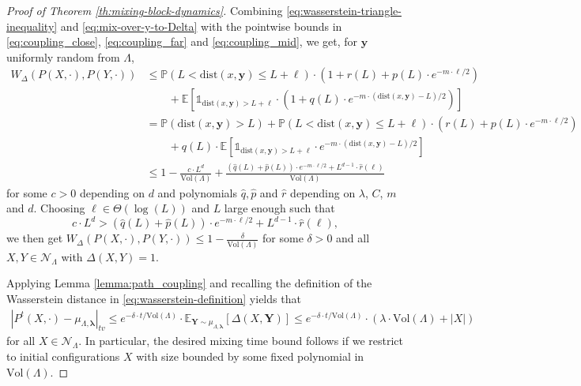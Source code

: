 \documentclass[10pt]{amsart}
\theoremstyle{definition}
\theoremstyle{remark}
\newcommand{\pointsets}{\mathcal{N}}
\newcommand{\ind}[1]{\mathds{1}_{#1}}
\newcommand{\bY}{\mathbf{Y}}
\newcommand{\dist}{\mathrm{dist}}
\renewcommand{\P}{\mathbb{P}}
\newcommand{\E}{\mathbb{E}}
\newcommand{\region}{\Lambda}
\newcommand{\activity}{\lambda}
\newcommand{\activities}{\pmb{\lambda}}
\newcommand{\size}[1]{\left\lvert#1\right\rvert}
\newcommand{\vol}{\mathrm{Vol}}
\newcommand{\randpoint}{\mathbf{y}}
\newcommand{\absolute}[1]{\left\lvert#1\right\rvert}
\begin{document}
\begin{proof}[Proof of Theorem \ref{th:mixing-block-dynamics}]
		Combining \eqref{eq:wasserstein-triangle-inequality} and \eqref{eq:mix-over-y-to-Delta} with the pointwise bounds in  \eqref{eq:coupling_close}, \eqref{eq:coupling_far} and \eqref{eq:coupling_mid}, we get, for $\randpoint$ uniformly random from $\region$,
		\begin{align*}
			W_{\Delta}(P(X, \cdot), P(Y, \cdot)) 
			&\le \P(L < \dist(x, \randpoint) \le L + \ell) \cdot \left(1 + r(L) + p(L) \cdot e^{-m \cdot \ell/2} \right) \\
			&\hspace{2em} + \E\left[\ind{\dist(x, \randpoint) > L + \ell} \cdot \left(1 + q(L) \cdot e^{-m \cdot (\dist(x, \randpoint) - L) / 2}\right)\right] \\
			&= \P(\dist(x, \randpoint) > L) + \P(L < \dist(x, \randpoint) \le L + \ell) \cdot \left(r(L) + p(L) \cdot e^{-m \cdot \ell/2} \right) \\
			&\hspace{2em} + q(L) \cdot \E\left[\ind{\dist(x, \randpoint) > L + \ell} \cdot e^{-m \cdot (\dist(x, \randpoint) - L) / 2} \right] \\
			&\le 1 - \frac{c \cdot L^d}{\vol(\region)} + \frac{(\hat{q}(L) + \hat{p}(L)) \cdot e^{-m\cdot \ell /2} + L^{d-1} \cdot \hat{r}(\ell)}{\vol(\region)} 
		\end{align*}
		for some $c > 0$ depending on $d$ and polynomials $\hat{q}, \hat{p}$ and $\hat{r}$ depending on $\activity$, $C$, $m$ and $d$.
		Choosing $\ell \in \Theta(\log(L))$ and $L$ large enough such that
		\[
		c \cdot L^d > (\hat{q}(L) + \hat{p}(L)) \cdot e^{-m\cdot \ell /2} + L^{d-1} \cdot \hat{r}(\ell),
		\]
		we then get $W_{\Delta}(P(X, \cdot), P(Y, \cdot)) \le 1 - \frac{\delta}{\vol(\region)}$ for some $\delta > 0$ and all $X, Y \in \pointsets_{\region}$ with $\Delta(X, Y) = 1$.
		
		Applying Lemma \ref{lemma:path_coupling} and recalling the definition of the Wasserstein distance in \eqref{eq:wasserstein-definition} yields that 
		\begin{align}
			\absolute{P^t(X, \cdot) - \mu_{\region, \activities}}_{tv} \le e^{-\delta \cdot t/\vol(\region)} \cdot \E_{\bY \sim \mu_{\region, \activities}}[\Delta(X, \bY)] \le e^{-\delta \cdot t/\vol(\region)} \cdot (\activity \cdot \vol(\region) + \size{X}) \label{eq:mixing}
		\end{align}
		for all $X \in \pointsets_{\region}$.
		In particular, the desired mixing time bound follows if we restrict to initial configurations $X$ with size bounded by some fixed polynomial in $\vol(\region)$.
		

\end{proof}
\end{document}
